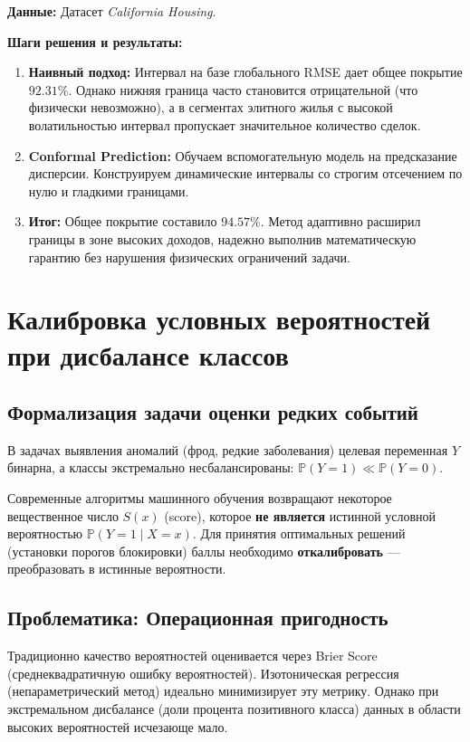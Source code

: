 \documentclass[12pt, a4paper]{article}
\begin{document}
\textbf{Данные:} Датасет \textit{California Housing}.

\textbf{Шаги решения и результаты:}
\begin{enumerate}
    \item \textbf{Наивный подход:} Интервал на базе глобального RMSE дает общее покрытие $92.31\%$. Однако нижняя граница часто становится отрицательной (что физически невозможно), а в сегментах элитного жилья с высокой волатильностью интервал пропускает значительное количество сделок.
    \item \textbf{Conformal Prediction:} Обучаем вспомогательную модель на предсказание дисперсии. Конструируем динамические интервалы со строгим отсечением по нулю и гладкими границами.
    \item \textbf{Итог:} Общее покрытие составило $94.57\%$. Метод адаптивно расширил границы в зоне высоких доходов, надежно выполнив математическую гарантию без нарушения физических ограничений задачи.
\end{enumerate}

\newpage
\section{Калибровка условных вероятностей при дисбалансе классов}

\subsection{Формализация задачи оценки редких событий}
В задачах выявления аномалий (фрод, редкие заболевания) целевая переменная $Y$ бинарна, а классы экстремально несбалансированы: $\mathbb{P}(Y=1) \ll \mathbb{P}(Y=0)$.

Современные алгоритмы машинного обучения возвращают некоторое вещественное число $S(x)$ (score), которое \textbf{не является} истинной условной вероятностью $\mathbb{P}(Y=1 \mid X=x)$. Для принятия оптимальных решений (установки порогов блокировки) баллы необходимо \textbf{откалибровать} — преобразовать в истинные вероятности.

\subsection{Проблематика: Операционная пригодность}
Традиционно качество вероятностей оценивается через Brier Score (среднеквадратичную ошибку вероятностей). Изотоническая регрессия (непараметрический метод) идеально минимизирует эту метрику. Однако при экстремальном дисбалансе (доли процента позитивного класса) данных в области высоких вероятностей исчезающе мало. 
\end{document}

